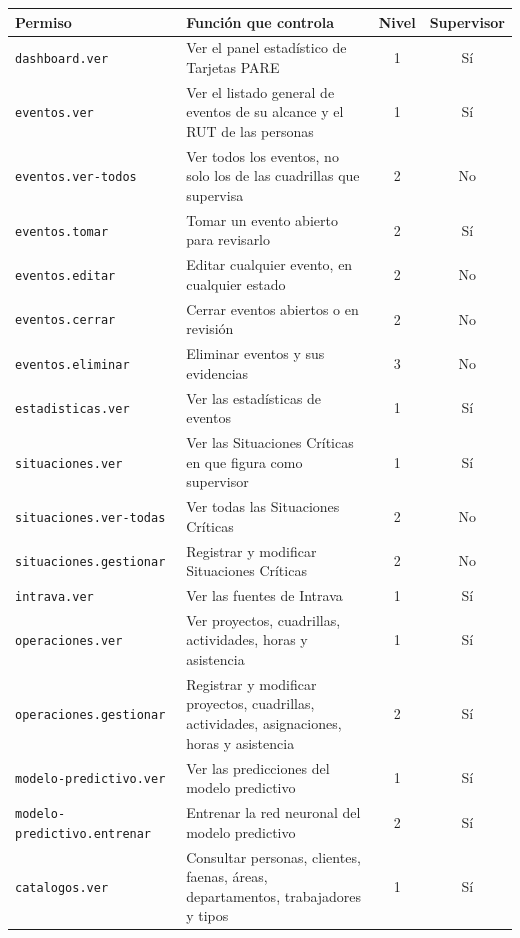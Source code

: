 \begin{center}
\small
\begin{tabular}{|l|p{6.5cm}|c|c|}
\hline
\textbf{Permiso} & \textbf{Funci\'on que controla} & \textbf{Nivel} & \textbf{Supervisor} \\ \hline
\texttt{dashboard.ver} & Ver el panel estad\'istico de Tarjetas PARE & 1 & S\'i \\ \hline
\texttt{eventos.ver} & Ver el listado general de eventos de su alcance y el RUT de las personas & 1 & S\'i \\ \hline
\texttt{eventos.ver-todos} & Ver todos los eventos, no solo los de las cuadrillas que supervisa & 2 & No \\ \hline
\texttt{eventos.tomar} & Tomar un evento abierto para revisarlo & 2 & S\'i \\ \hline
\texttt{eventos.editar} & Editar cualquier evento, en cualquier estado & 2 & No \\ \hline
\texttt{eventos.cerrar} & Cerrar eventos abiertos o en revisi\'on & 2 & No \\ \hline
\texttt{eventos.eliminar} & Eliminar eventos y sus evidencias & 3 & No \\ \hline
\texttt{estadisticas.ver} & Ver las estad\'isticas de eventos & 1 & S\'i \\ \hline
\texttt{situaciones.ver} & Ver las Situaciones Cr\'iticas en que figura como supervisor & 1 & S\'i \\ \hline
\texttt{situaciones.ver-todas} & Ver todas las Situaciones Cr\'iticas & 2 & No \\ \hline
\texttt{situaciones.gestionar} & Registrar y modificar Situaciones Cr\'iticas & 2 & No \\ \hline
\texttt{intrava.ver} & Ver las fuentes de Intrava & 1 & S\'i \\ \hline
\texttt{operaciones.ver} & Ver proyectos, cuadrillas, actividades, horas y asistencia & 1 & S\'i \\ \hline
\texttt{operaciones.gestionar} & Registrar y modificar proyectos, cuadrillas, actividades, asignaciones, horas y asistencia & 2 & S\'i \\ \hline
\texttt{modelo-predictivo.ver} & Ver las predicciones del modelo predictivo & 1 & S\'i \\ \hline
\texttt{modelo-predictivo.entrenar} & Entrenar la red neuronal del modelo predictivo & 2 & S\'i \\ \hline
\texttt{catalogos.ver} & Consultar personas, clientes, faenas, \'areas, departamentos, trabajadores y tipos & 1 & S\'i \\ \hline

\end{tabular}
\end{center}
